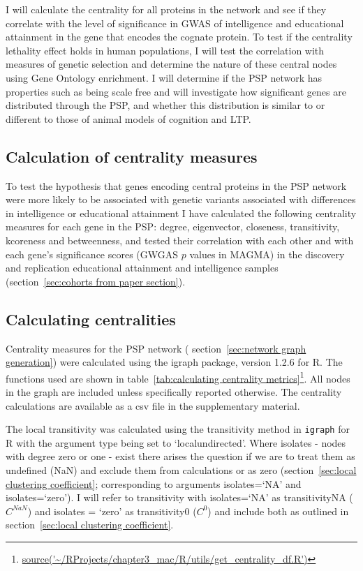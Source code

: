  I will calculate the centrality for all proteins in the network and see if they correlate with the level of significance in GWAS of intelligence and educational attainment in the gene that encodes the cognate protein. To test if the centrality lethality effect holds in human populations, I will test the correlation with measures of genetic selection and determine the nature of these central nodes using Gene Ontology enrichment. I will determine if the PSP network has properties such as being scale free and will investigate how significant genes are distributed through the PSP, and whether this distribution is similar to or different to those of animal models of cognition and LTP. 
 
    \subsection{Calculation of centrality measures}

To test the hypothesis that genes encoding central proteins in the  PSP network were more likely to be associated with genetic variants associated with differences in intelligence or educational attainment I have calculated the following centrality measures for each gene in the PSP: degree, eigenvector, closeness, transitivity, kcoreness and betweenness, and tested their correlation with each other and with each gene's significance scores (GWGAS $p$ values in MAGMA) in the discovery and replication educational attainment and intelligence samples (section~\ref{sec:cohorts from paper section}). 


\subsection{Calculating centralities}
\label{sec:calculating centralities}
Centrality measures for the PSP network ( section~\ref{sec:network graph generation}) were calculated using the igraph package, version 1.2.6 for R. The functions used are shown in table~\ref{tab:calculating centrality metrics}\footnote{\url{source('~/RProjects/chapter3_mac/R/utils/get_centrality_df.R')}}. All nodes in the graph are included unless specifically reported otherwise. The centrality calculations are available as a csv file in the supplementary material.

The local transitivity was calculated using the transitivity method in \texttt{igraph} for R with the argument type being set to `localundirected'. Where isolates - nodes with degree zero or one - exist there arises the question if we are to treat them as undefined (NaN) and exclude them from calculations or as zero (section~\ref{sec:local clustering coefficient}; corresponding to arguments isolates=`NA' and isolates=`zero'). I will refer to transitivity with isolates=`NA' as transitivityNA ($C^{NaN}$) and isolates = `zero' as transitivity0 ($C^0$) and include both as outlined in section~\ref{sec:local clustering coefficient}\cite{schank2005approximating}.

